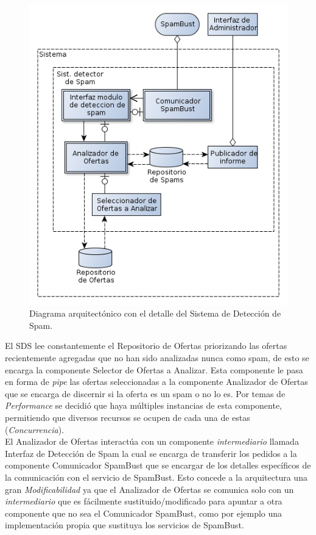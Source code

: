 \begin{figure}[H]
	\centering
	\includegraphics[width=\textwidth]{graficos/arch/Sistema_deteccion_spam.png}
	\caption{Diagrama arquitectónico con el detalle del \textsf{Sistema de Detección de Spam}.}
\end{figure}

El SDS lee constantemente el \textsf{Repositorio de Ofertas} priorizando las ofertas recientemente agregadas que no han sido analizadas nunca como spam, de esto se encarga la componente \textsf{Selector de Ofertas a Analizar}. Esta componente le pasa en forma de \emph{pipe} las ofertas seleccionadas a la componente \textsf{Analizador de Ofertas} que se encarga de discernir si la oferta es un spam o no lo es. Por temas de \emph{Performance} se decidió que haya múltiples instancias de esta componente, permitiendo que diversos recursos se ocupen de cada una de estas (\emph{Concurrencia}).\\

El \textsf{Analizador de Ofertas} interactúa con un componente \emph{intermediario} llamada \textsf{Interfaz de Detección de Spam} la cual se encarga de transferir los pedidos a la componente \textsf{Comunicador SpamBust} que se encargar de los detalles específicos de la comunicación con el servicio de \textsf{SpamBust}. Esto concede a la arquitectura una gran \emph{Modificabilidad} ya que el \textsf{Analizador de Ofertas} se comunica solo con un \emph{intermediario} que es fácilmente sustituido/modificado para apuntar a otra componente que no sea el \textsf{Comunicador SpamBust}, como por ejemplo una implementación propia que sustituya los servicios de SpamBust.\\

